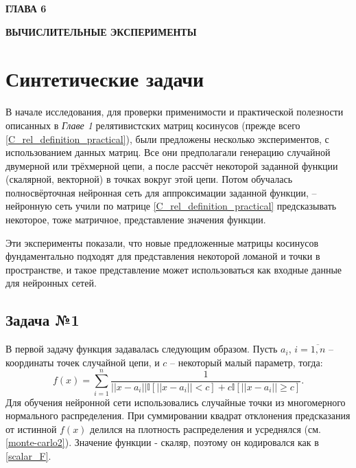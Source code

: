 \newpage
\begin{center}
	\textbf{\large ГЛАВА 6}

	\textbf{\large ВЫЧИСЛИТЕЛЬНЫЕ ЭКСПЕРИМЕНТЫ}
\end{center}

\section{Синтетические задачи}

В начале исследования, для проверки применимости и практической полезности описанных в \textit{Главе 1} релятивистских матриц косинусов (прежде всего \ref{C_rel_definition_practical}), были предложены несколько экспериментов, с использованием данных матриц. Все они предполагали генерацию случайной двумерной или трёхмерной цепи, а после рассчёт некоторой заданной функции (скалярной, векторной) в точках вокруг этой цепи. Потом обучалась полносвёрточная нейронная сеть для аппроксимации заданной функции, -- нейронную сеть учили по матрице \ref{C_rel_definition_practical} предсказывать некоторое, тоже матричное, представление значения функции.

Эти эксперименты показали, что новые предложенные матрицы косинусов фундаментально подходят для представления некоторой ломаной и точки в пространстве, и такое представление может использоваться как входные данные для нейронных сетей.

\subsection{Задача №1}
В первой задачу функция задавалась следующим образом. Пусть $a_i$, $i=\overline{1,n}$ -- координаты точек случайной цепи, и $c$ -- некоторый малый параметр, тогда:
\begin{equation}
	f(x) = \sum_{i=1}^n\frac{1}{||x - a_i||\mathbb{I}[||x - a_i|| < c] + c\mathbb{I}[||x - a_i|| \ge c]}.
	\label{synt1_f}
\end{equation}
Для обучения нейронной сети использовались случайные точки из многомерного нормального распределения. При суммировании квадрат отклонения предсказания от истинной $f(x)$ делился на плотность распределения и усреднялся (см. \ref{monte-carlo2}). Значение функции - скаляр, поэтому он кодировался как в \ref{scalar_F}.

